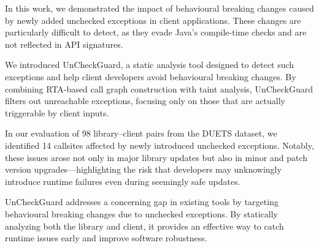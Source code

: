 In this work, we demonstrated the impact of behavioural breaking changes caused by newly added unchecked exceptions in client applications. These changes are particularly difficult to detect, as they evade Java's compile-time checks and are not reflected in API signatures.

We introduced UnCheckGuard, a static analysis tool designed to detect such exceptions and help client developers avoid behavioural breaking changes. By combining RTA-based call graph construction with taint analysis, UnCheckGuard filters out unreachable exceptions, focusing only on those that are actually triggerable by client inputs.

In our evaluation of 98 library–client pairs from the DUETS dataset, we identified 14 callsites affected by newly introduced unchecked exceptions. Notably, these issues arose not only in major library updates but also in minor and patch version upgrades—highlighting the risk that developers may unknowingly introduce runtime failures even during seemingly safe updates.

UnCheckGuard addresses a concerning gap in existing tools by targeting behavioural breaking changes due to unchecked exceptions. By statically analyzing both the library and client, it provides an effective way to catch runtime issues early and improve software robustness.
